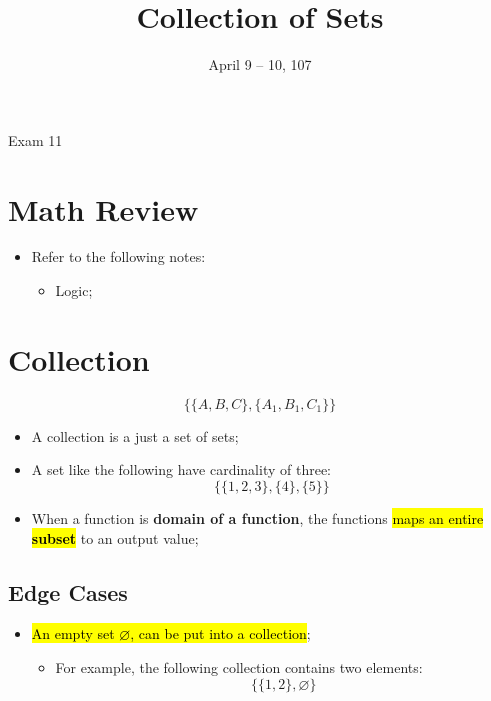 \documentclass{note}
\date{April 9 -- 10, 107}
\title{Collection of Sets}
\begin{document}
\begin{note}{Exam 11}

\section{Math Review}

\begin{itemize}
    \item Refer to the following notes:
    \begin{itemize}
        \item Logic;
    \end{itemize}
\end{itemize}

\section{Collection}

\begin{displaymath}
    \{ \{A, B, C \}, \{ A_{1}, B_{1}, C_{1} \} \}
\end{displaymath}

\begin{itemize}
    \item A collection is a just a set of sets;
    \item A set like the following have cardinality of three:
    \begin{displaymath}
        \{ \{ 1, 2, 3 \}, \{ 4 \}, \{ 5 \} \}
    \end{displaymath}
    \item When a function is \textbf{domain of a function}, the functions \hl{maps an entire \textbf{subset}} to an output value;
\end{itemize}

    \subsection{Edge Cases}

    \begin{itemize}
        \item \hl{An empty set $ \varnothing $, can be put into a collection};
        \begin{itemize}
            \item For example, the following collection contains two elements:
            \begin{displaymath}
                \{ \{ 1, 2 \}, \varnothing \}
            \end{displaymath}
        \end{itemize}


\end{itemize}
\end{note}
\end{document}
